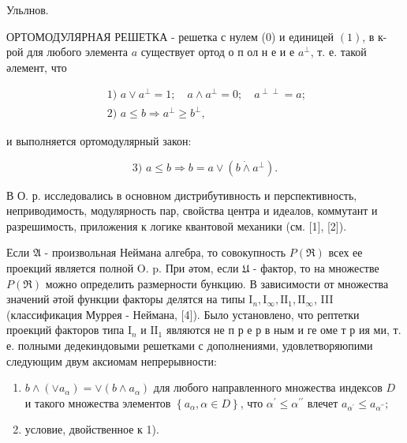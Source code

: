 \documentclass[10pt]{article}
\begin{document}
Ульлнов.



ОРТОМОДУЛЯРНАЯ РЕШЕТКА - решетка с нулем (0) и единицей $(1)$, в к-рой для любого элемента $a$ существует ортод о п ол н е и е $a^{\perp}$, т. е. такой әлемент, что



\[

\begin{gathered}

\text { 1) } a \vee a^{\perp}=1 ; \quad a \wedge a^{\perp}=0 ; \quad a^{\perp \perp}=a ; \\

\text { 2) } a \leqslant b \Rightarrow a^{\perp} \geqslant b^{\perp},

\end{gathered}

\]



и выполняется ортомодулярный закон:



\[

\text { 3) } a \leqslant b \Rightarrow b=a \vee\left(b \dot{\wedge} a^{\perp}\right) \text {. }

\]



В О. р. исследовались в основном дистрибутивность и перспективность, неприводимость, модулярность пар, свойства центра и идеалов, коммутант и разрешимость, приложения к логике квантовой механики (см. [1], [2]).



Если $\mathfrak{A}$ - произвольная Неймана алгебра, то совокупность $P(\mathfrak{\Re})$ всех ее проекций является полной O. p. При әтом, если $\mathfrak{U}$ - фактор, то на множестве $P(\mathfrak{\Re})$ можно определить размерности бункцию. В зависимости от множества значений әтой функции факторы делятся на типы $\mathrm{I}_{n}, \mathrm{I}_{\infty}, \mathrm{II}_{1}, \mathrm{II}_{\infty}$, III (классификация Муррея - Неймана, [4]). Было установлено, что рептетки проекций факторов типа $\mathrm{I}_{n}$ и $\mathrm{II}_{1}$ являются не п р е р в ным и ге оме т р ия ми, т. е. полными дедекиндовыми решетками с дополнениями, удовлетворяюпими следующим двум аксиомам непрерывности:



\begin{enumerate}

  \item $b \wedge\left(\vee a_{\alpha}\right)=\vee\left(b \wedge a_{\alpha}\right)$ для любого направленного множества индексов $D$ и такого множества элементов $\left\{a_{\alpha}, \alpha \in D\right\}$, что $\alpha^{\prime} \leqslant \alpha^{\prime \prime}$ влечет $a_{\alpha^{\prime}} \leqslant a_{\alpha^{\prime \prime}} ;$



  \item условие, двойственное к 1).



\end{enumerate}
\end{document}
